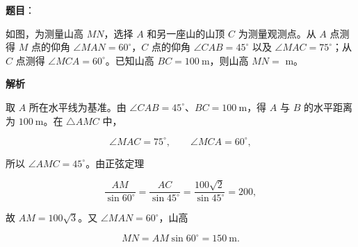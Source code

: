 \begin{answer}

\textbf{题目}：

如图，为测量山高 $MN$，选择 $A$ 和另一座山的山顶 $C$ 为测量观测点。从 $A$ 点测得 $M$ 点的仰角 $\angle MAN=60^\circ$，$C$ 点的仰角 $\angle CAB=45^\circ$ 以及 $\angle MAC=75^\circ$；从 $C$ 点测得 $\angle MCA=60^\circ$。已知山高 $BC=100\ \mathrm m$，则山高 $MN=$\gkblank{} $\mathrm m$。
\nopagebreak[4]
\begin{center}\end{center}
\nopagebreak[4]
\textbf{解析}

取 $A$ 所在水平线为基准。由 $\angle CAB=45^\circ$、$BC=100\ \mathrm m$，得 $A$ 与 $B$ 的水平距离为 $100\ \mathrm m$。在 $\triangle AMC$ 中，

\nopagebreak[4]
\[
\angle MAC=75^\circ,\qquad \angle MCA=60^\circ,
\]

所以 $\angle AMC=45^\circ$。由正弦定理

\nopagebreak[4]
\[
\frac{AM}{\sin60^\circ}=\frac{AC}{\sin45^\circ}
=\frac{100\sqrt2}{\sin45^\circ}=200,
\]

故 $AM=100\sqrt3$。又 $\angle MAN=60^\circ$，山高

\nopagebreak[4]
\[
MN=AM\sin60^\circ=150\ \mathrm m.
\]


\end{answer}

